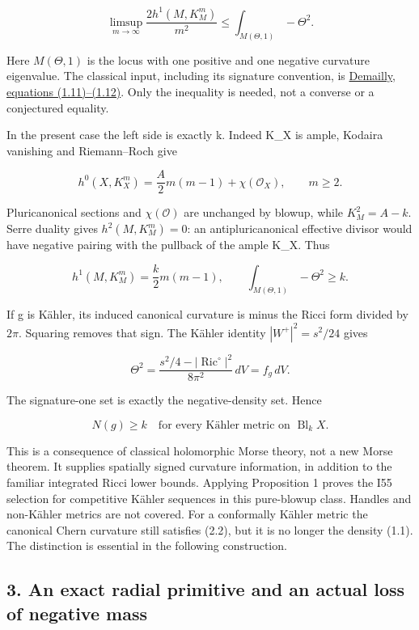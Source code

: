 \documentclass[
  10pt,
]{article}
\begin{document}
\[
 \limsup_{m\to\infty}\frac{2h^1(M,K_M^m)}{m^2}
 \le\int_{M(\Theta,1)}-\Theta^2. \tag{2.1}
\]

Here \(M(\Theta,1)\) is the locus with one positive and one negative
curvature eigenvalue. The classical input, including its signature
convention, is \href{https://arxiv.org/html/1003.5067}{Demailly,
equations (1.11)--(1.12)}. Only the inequality is needed, not a converse
or a conjectured equality.

In the present case the left side is exactly k. Indeed K\_X is ample,
Kodaira vanishing and Riemann--Roch give

\[
 h^0(X,K_X^m)=\frac{A}{2}m(m-1)+\chi(\mathcal O_X),\qquad m\ge2.
\]

Pluricanonical sections and \(\chi(\mathcal O)\) are unchanged by
blowup, while \(K_M^2=A-k\). Serre duality gives \(h^2(M,K_M^m)=0\): an
antipluricanonical effective divisor would have negative pairing with
the pullback of the ample K\_X. Thus

\[
 h^1(M,K_M^m)=\frac{k}{2}m(m-1),\qquad
 \int_{M(\Theta,1)}-\Theta^2\ge k. \tag{2.2}
\]

If g is Kähler, its induced canonical curvature is minus the Ricci form
divided by \(2\pi\). Squaring removes that sign. The Kähler identity
\(|W^+|^2=s^2/24\) gives

\[
 \Theta^2=\frac{s^2/4-|\operatorname{Ric}^{\circ}|^2}{8\pi^2}\,dV
          =f_g\,dV.
\]

The signature-one set is exactly the negative-density set. Hence

\[
 \boxed{N(g)\ge k\quad\text{for every Kähler metric on }\operatorname{Bl}_k X.}
 \tag{2.3}
\]

This is a consequence of classical holomorphic Morse theory, not a new
Morse theorem. It supplies spatially signed curvature information, in
addition to the familiar integrated Ricci lower bounds. Applying
Proposition 1 proves the I55 selection for competitive Kähler sequences
in this pure-blowup class. Handles and non-Kähler metrics are not
covered. For a conformally Kähler metric the canonical Chern curvature
still satisfies (2.2), but it is no longer the density (1.1). The
distinction is essential in the following construction.

\hypertarget{an-exact-radial-primitive-and-an-actual-loss-of-negative-mass}{%
\subsection{3. An exact radial primitive and an actual loss of negative
mass}\label{an-exact-radial-primitive-and-an-actual-loss-of-negative-mass}}
\end{document}
